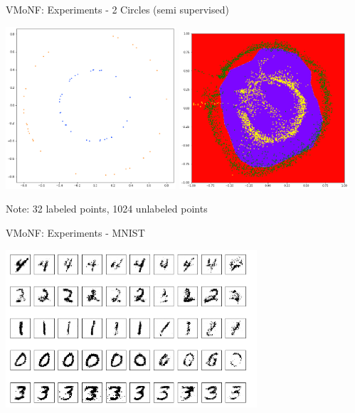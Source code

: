 \documentclass[12pt,ignorenonframetext,]{beamer}
\begin{document}
\begin{frame}{VMoNF: Experiments - 2 Circles (semi supervised)}
\protect\hypertarget{vmonf-experiments---2-circles-semi-supervised}{}

\centering

\includegraphics[width=0.475\textwidth]{figures/labeled_2_circles.png}
\hfill
\includegraphics[width=0.475\textwidth]{figures/trained_2_circles_semisup.png}

Note: 32 labeled points, 1024 unlabeled points

\end{frame}

\begin{frame}{VMoNF: Experiments - MNIST}
\protect\hypertarget{vmonf-experiments---mnist}{}

\centering

\includegraphics[width=0.7\textwidth]{figures/trained_mnist.png}

\end{frame}
\end{document}

